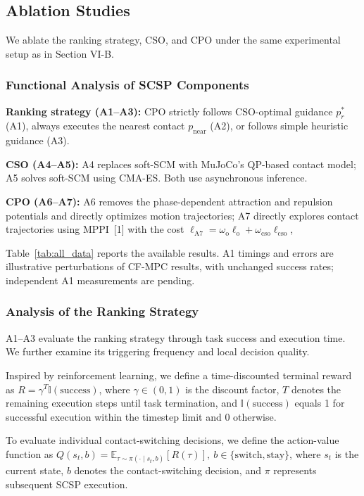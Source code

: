 \subsection{Ablation Studies}


We ablate the ranking strategy, CSO, and CPO under the same experimental setup as in Section VI-B.

\subsubsection{Functional Analysis of SCSP Components}
\label{sec:component_ablation}
\textbf{Ranking strategy (A1--A3):} CPO strictly follows CSO-optimal guidance $p_r^*$ (A1), always executes the nearest contact $p_{\text{near}}$ (A2), or follows simple heuristic guidance (A3).

\textbf{CSO (A4--A5):} A4 replaces soft-SCM with MuJoCo's QP-based contact model; A5 solves soft-SCM using CMA-ES. Both use asynchronous inference.

\textbf{CPO (A6--A7):} A6 removes the phase-dependent attraction and repulsion potentials and directly optimizes motion trajectories; A7 directly explores contact trajectories using MPPI~[1] with the cost $\ell_{\mathrm{A7}} = \omega_{\text{o}}\ell_{\text{o}} + \omega_{\text{cso}}\ell_{\text{cso}}$,

Table~\ref{tab:all_data} reports the available results. A1 timings and errors are illustrative perturbations of CF-MPC results, with unchanged success rates; independent A1 measurements are pending.

\subsubsection{Analysis of the Ranking Strategy}
\label{sec:ranking_ablation}
A1--A3 evaluate the ranking strategy through task success and execution time. We further examine its triggering frequency and local decision quality.

Inspired by reinforcement learning, we define a time-discounted terminal reward as $
R=\gamma^{T}\mathbb{I}(\mathrm{success})$,
where $\gamma\in(0,1)$ is the discount factor, $T$ denotes the remaining execution steps until task termination, and $\mathbb{I}(\mathrm{success})$ equals 1 for successful execution within the timestep limit and 0 otherwise.

To evaluate individual contact-switching decisions, we define the action-value function as $
Q(s_t,b)=\mathbb{E}_{\tau\sim\pi(\cdot\mid s_t,b)}[R(\tau)], \ b\in\{\mathrm{switch},\mathrm{stay}\}$, 
where $s_t$ is the current state, $b$ denotes the contact-switching decision, and $\pi$ represents subsequent SCSP execution.

